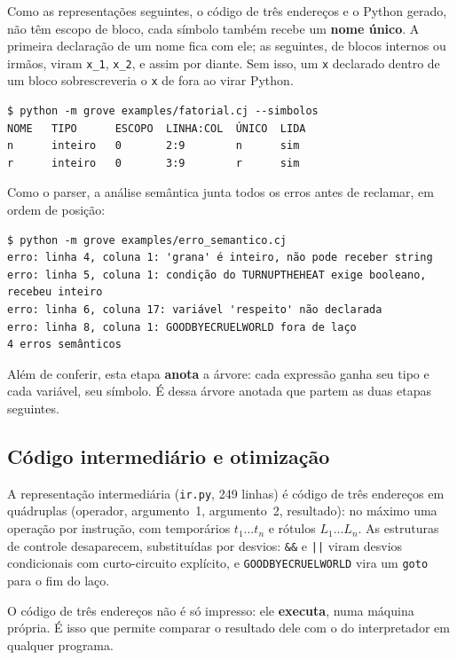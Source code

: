 \documentclass[conference]{IEEEtran}
\begin{document}
Como as representações seguintes, o código de três endereços e o Python gerado, não têm escopo de bloco, cada símbolo também recebe um \textbf{nome único}. A primeira declaração de um nome fica com ele; as seguintes, de blocos internos ou irmãos, viram \texttt{x\_1}, \texttt{x\_2}, e assim por diante. Sem isso, um \texttt{x} declarado dentro de um bloco sobrescreveria o \texttt{x} de fora ao virar Python.

\begin{lstlisting}
$ python -m grove examples/fatorial.cj --simbolos
NOME   TIPO      ESCOPO  LINHA:COL  ÚNICO  LIDA
n      inteiro   0       2:9        n      sim
r      inteiro   0       3:9        r      sim
\end{lstlisting}

Como o parser, a análise semântica junta todos os erros antes de reclamar, em ordem de posição:

\begin{lstlisting}
$ python -m grove examples/erro_semantico.cj
erro: linha 4, coluna 1: 'grana' é inteiro, não pode receber string
erro: linha 5, coluna 1: condição do TURNUPTHEHEAT exige booleano, recebeu inteiro
erro: linha 6, coluna 17: variável 'respeito' não declarada
erro: linha 8, coluna 1: GOODBYECRUELWORLD fora de laço
4 erros semânticos
\end{lstlisting}

Além de conferir, esta etapa \textbf{anota} a árvore: cada expressão ganha seu tipo e cada variável, seu símbolo. É dessa árvore anotada que partem as duas etapas seguintes.

\subsection{Código intermediário e otimização}

A representação intermediária (\texttt{ir.py}, 249 linhas) é código de três endereços em quádruplas (operador, argumento~1, argumento~2, resultado): no máximo uma operação por instrução, com temporários $t_1 \ldots t_n$ e rótulos $L_1 \ldots L_n$. As estruturas de controle desaparecem, substituídas por desvios: \texttt{\&\&} e \texttt{||} viram desvios condicionais com curto-circuito explícito, e \texttt{GOODBYECRUELWORLD} vira um \texttt{goto} para o fim do laço.

O código de três endereços não é só impresso: ele \textbf{executa}, numa máquina própria. É isso que permite comparar o resultado dele com o do interpretador em qualquer programa.
\end{document}
